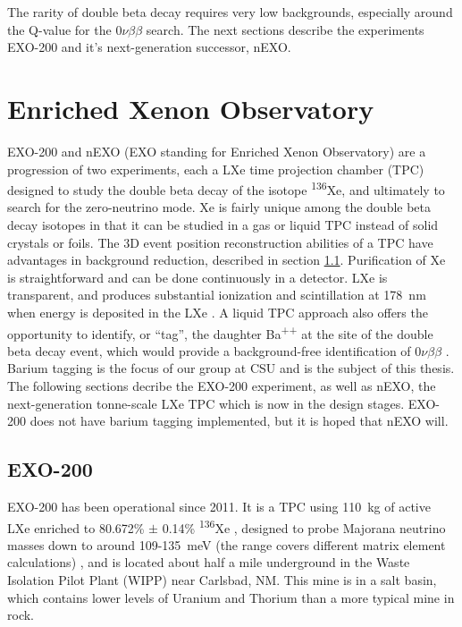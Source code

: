 The rarity of double beta decay requires very low backgrounds, especially around the Q-value for the $0\nu\beta\beta$ search. The next sections describe the experiments EXO-200 and it's next-generation successor, nEXO.

\section{Enriched Xenon Observatory}

EXO-200 and nEXO (EXO standing for Enriched Xenon Observatory) are a progression of two experiments, each a LXe time projection chamber (TPC) designed to study the double beta decay of the isotope \textsuperscript{136}Xe, and ultimately to search for the zero-neutrino mode.  Xe is fairly unique among the double beta decay isotopes in that it can be studied in a gas or liquid TPC instead of solid crystals or foils.  The 3D event position reconstruction abilities of a TPC have advantages in background reduction, described in section \ref{subsec:EXO200}.  Purification of Xe is straightforward and can be done continuously in a detector.  LXe is transparent, and produces substantial ionization and scintillation at 178~nm when energy is deposited in the LXe \cite{EXO200TwoNuLong}.  A liquid TPC approach also offers the opportunity to identify, or ``tag'', the daughter Ba\textsuperscript{++} at the site of the double beta decay event, which would provide a background-free identification of $0\nu\beta\beta$ \cite{Moe1991}. Barium tagging is the focus of our group at CSU and is the subject of this thesis.  The following sections decribe the EXO-200 experiment, as well as nEXO, the next-generation tonne-scale LXe TPC which is now in the design stages.  EXO-200 does not have barium tagging implemented, but it is hoped that nEXO will. 

\subsection{EXO-200}
\label{subsec:EXO200}

EXO-200 has been operational since 2011.  It is a TPC using 110~kg of active LXe enriched to 80.672\% $\pm$ 0.14\% \textsuperscript{136}Xe \cite{EXO200TwoNuLong},  designed to probe Majorana neutrino masses down to around 109-135~meV (the range covers different matrix element calculations) \cite{EXO200instrumentationPart1}, and is located about half a mile underground in the Waste Isolation Pilot Plant (WIPP) near Carlsbad, NM.  This mine is in a salt basin, which contains lower levels of Uranium and Thorium than a more typical mine in rock.

